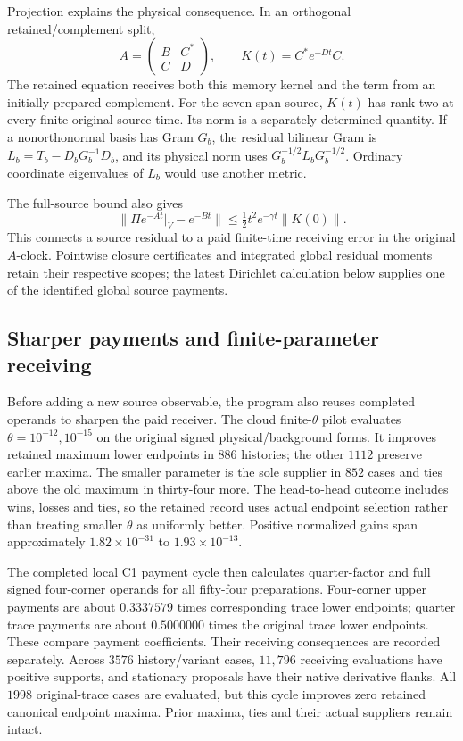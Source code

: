 Projection explains the physical consequence. In an orthogonal retained/complement split,
\[
 A=\begin{pmatrix}B&C^*\\C&D\end{pmatrix},\qquad
 K(t)=C^*e^{-Dt}C.
\]
The retained equation receives both this memory kernel and the term from an initially prepared complement. For the seven-span source, $K(t)$ has rank two at every finite original source time. Its norm is a separately determined quantity. If a nonorthonormal basis has Gram $G_b$, the residual bilinear Gram is $L_b=T_b-D_bG_b^{-1}D_b$, and its physical norm uses $G_b^{-1/2}L_bG_b^{-1/2}$. Ordinary coordinate eigenvalues of $L_b$ would use another metric.

The full-source bound also gives
\[
 \|\Pi e^{-At}|_V-e^{-Bt}\|
 \leq\tfrac12t^2e^{-\gamma t}\|K(0)\|.
\]
This connects a source residual to a paid finite-time receiving error in the original $A$-clock. Pointwise closure certificates and integrated global residual moments retain their respective scopes; the latest Dirichlet calculation below supplies one of the identified global source payments.

\subsection{Sharper payments and finite-parameter receiving}

Before adding a new source observable, the program also reuses completed operands to sharpen the paid receiver. The cloud finite-$\theta$ pilot evaluates $\theta=10^{-12},10^{-15}$ on the original signed physical/background forms. It improves retained maximum lower endpoints in $886$ histories; the other $1112$ preserve earlier maxima. The smaller parameter is the sole supplier in $852$ cases and ties above the old maximum in thirty-four more. The head-to-head outcome includes wins, losses and ties, so the retained record uses actual endpoint selection rather than treating smaller $\theta$ as uniformly better. Positive normalized gains span approximately $1.82\times10^{-31}$ to $1.93\times10^{-13}$. 

The completed local C1 payment cycle then calculates quarter-factor and full signed four-corner operands for all fifty-four preparations. Four-corner upper payments are about $0.3337579$ times corresponding trace lower endpoints; quarter trace payments are about $0.5000000$ times the original trace lower endpoints. These compare payment coefficients. Their receiving consequences are recorded separately. Across $3576$ history/variant cases, $11{,}796$ receiving evaluations have positive supports, and stationary proposals have their native derivative flanks. All $1998$ original-trace cases are evaluated, but this cycle improves zero retained canonical endpoint maxima. Prior maxima, ties and their actual suppliers remain intact. 

